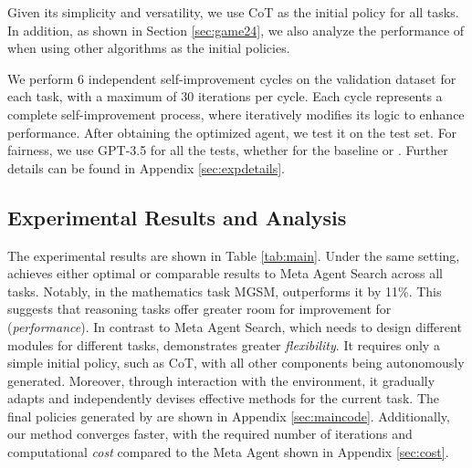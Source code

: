 Given its simplicity and versatility, we use CoT as the initial policy for all tasks.
In addition, as shown in Section \ref{sec:game24}, we also analyze the performance of \framework when using other algorithms as the initial policies.




We perform 6 independent self-improvement cycles on the validation dataset for each task, with a maximum of 30 iterations per cycle. Each cycle represents a complete self-improvement process, where \framework iteratively modifies its logic to enhance performance.
After obtaining the optimized agent, we test it on the test set. For fairness, we use GPT-3.5 for all the tests, whether for the baseline or \framework{}.
Further details can be found in Appendix \ref{sec:expdetails}.


\subsection{Experimental Results and Analysis}
The experimental results are shown in Table \ref{tab:main}. Under the same setting, \framework achieves either optimal or comparable results to Meta Agent Search across all tasks. Notably, in the mathematics task MGSM, \framework outperforms it by 11\%. This suggests that reasoning tasks offer greater room for improvement for \framework (\textit{performance}). 
In contrast to Meta Agent Search, which needs to design different modules for different tasks, \framework demonstrates greater \textit{flexibility}. It requires only a simple initial policy, such as CoT, with all other components being autonomously generated. 
Moreover, through interaction with the environment, it gradually adapts and independently devises effective methods for the current task. The final policies generated by \framework are shown in Appendix \ref{sec:maincode}. Additionally, our method converges faster, with the required number of iterations and computational \textit{cost} compared to the Meta Agent shown in Appendix \ref{sec:cost}. 

